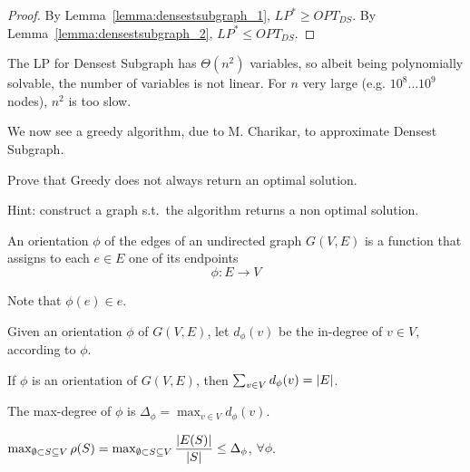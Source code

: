     \begin{proof}
        By Lemma~\ref{lemma:densestsubgraph_1}, $LP^* \geq OPT_{DS}$.
        By Lemma~\ref{lemma:densestsubgraph_2}, $LP^* \leq OPT_{DS}$.
    \end{proof}

    The LP for Densest Subgraph has $\Theta(n^2)$ variables, so albeit being polynomially solvable, the number of variables is not linear.
    For $n$ very large (e.g. $10^8 \dots 10^9$ nodes), $n^2$ is too slow.

    We now see a greedy algorithm, due to M. Charikar, to approximate Densest Subgraph.

    

    \begin{exercise}
        Prove that Greedy does not always return an optimal solution.

        Hint: construct a graph s.t.~the algorithm returns a non optimal solution.
    \end{exercise}

    \begin{definition}[Orientation]
        An orientation $\phi$ of the edges of an undirected graph $G(V,E)$ is a function that assigns to each $e \in E$ one of its endpoints
        \[ \phi : E \rightarrow V \]
    \end{definition}
    
    Note that $\phi(e) \in e$.

    \begin{definition}
        Given an orientation $\phi$ of $G(V,E)$, let $d_\phi(v)$ be the in-degree of $v \in V$, according to $\phi$.
    \end{definition}

    \begin{observation}
        If $\phi$ is an orientation of $G(V,E)$, then $\sum_{v \in V} d_\phi(v) = \vert E \vert$.
    \end{observation}

    \begin{definition}
        The max-degree of $\phi$ is $\Delta_\phi = \max_{v \in V} d_\phi(v)$.
    \end{definition}

    \begin{lemma}
        $\max_{\emptyset \subset S \subseteq V} \rho(S) = \max_{\emptyset \subset S \subseteq V} \dfrac{\vert E(S) \vert}{\vert S \vert} \leq \Delta_\phi$, $\forall \phi$.
    \end{lemma}

